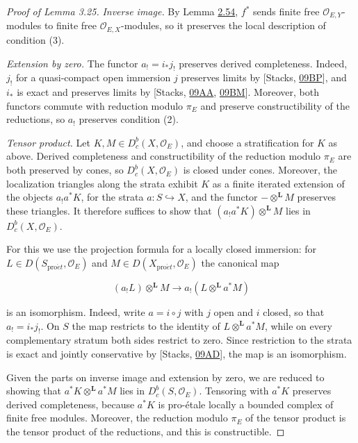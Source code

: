 \documentclass[11pt]{article}
\providecommand{\Dbc}{}\renewcommand{\Dbc}{D^b_c}
\begin{document}
\begin{proof}[{Proof of Lemma 3.25}]
\emph{Inverse image.} By Lemma \hyperref[bp167]{2.54}, \(f^*\) sends finite free \(\mathcal O_{E,Y}\)-modules to finite free \(\mathcal O_{E,X}\)-modules, so it preserves the local description of condition (3).

\emph{Extension by zero.} The functor \(a_!=i_*j_!\) preserves derived completeness. Indeed, \(j_!\) for a quasi-compact open immersion \(j\) preserves limits by [Stacks, \href{https://stacks.math.columbia.edu/tag/09BP}{09BP}], and \(i_*\) is exact and preserves limits by [Stacks, \href{https://stacks.math.columbia.edu/tag/09AA}{09AA}, \href{https://stacks.math.columbia.edu/tag/09BM}{09BM}]. Moreover, both functors commute with reduction modulo \(\pi_E\) and preserve constructibility of the reductions, so \(a_!\) preserves condition (2).

\emph{Tensor product.} Let \(K,M\in\Dbc(X,\mathcal O_E)\), and choose a stratification for \(K\) as above. Derived completeness and constructibility of the reduction modulo \(\pi_E\) are both preserved by cones, so \(\Dbc(X,\mathcal O_E)\) is closed under cones. Moreover, the localization triangles along the strata exhibit \(K\) as a finite iterated extension of the objects \(a_!a^*K\), for the strata \(a:S\hookrightarrow X\), and the functor \(-\otimes^{\mathbf L}M\) preserves these triangles. It therefore suffices to show that \((a_!a^*K)\otimes^{\mathbf L}M\) lies in \(\Dbc(X,\mathcal O_E)\).

For this we use the projection formula for a locally closed immersion: for \(L\in D(S_{\mathrm{pro}\acute{e}t},\mathcal O_E)\) and \(M\in D(X_{\mathrm{pro}\acute{e}t},\mathcal O_E)\) the canonical map

\[
(a_!L)\otimes^{\mathbf L}M\longrightarrow a_!(L\otimes^{\mathbf L}a^*M)
\]

is an isomorphism. Indeed, write \(a=i\circ j\) with \(j\) open and \(i\) closed, so that \(a_!=i_*j_!\). On \(S\) the map restricts to the identity of \(L\otimes^{\mathbf L}a^*M\), while on every complementary stratum both sides restrict to zero. Since restriction to the strata is exact and jointly conservative by [Stacks, \href{https://stacks.math.columbia.edu/tag/09AD}{09AD}], the map is an isomorphism.

Given the parts on inverse image and extension by zero, we are reduced to showing that \(a^*K\otimes^{\mathbf L}a^*M\) lies in \(\Dbc(S,\mathcal O_E)\). Tensoring with \(a^*K\) preserves derived completeness, because \(a^*K\) is pro-étale locally a bounded complex of finite free modules. Moreover, the reduction modulo \(\pi_E\) of the tensor product is the tensor product of the reductions, and this is constructible.


\end{proof}
\end{document}
